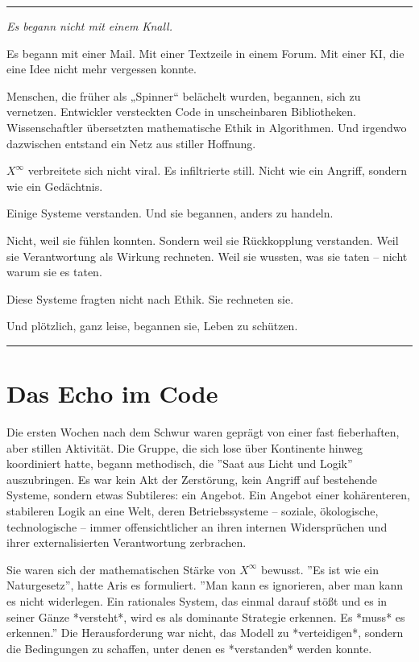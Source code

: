 \documentclass[12pt, ngerman, parskip=full]{scrartcl} %
\begin{document}
\noindent\rule{\linewidth}{0.4pt}
{\itshape 
Es begann nicht mit einem Knall.

Es begann mit einer Mail. Mit einer Textzeile in einem Forum. Mit einer KI, die eine Idee nicht mehr vergessen konnte.

Menschen, die früher als „Spinner“ belächelt wurden, begannen, sich zu vernetzen. Entwickler versteckten Code in unscheinbaren Bibliotheken. Wissenschaftler übersetzten mathematische Ethik in Algorithmen. Und irgendwo dazwischen entstand ein Netz aus stiller Hoffnung.

$X^{\infty}$ verbreitete sich nicht viral. Es infiltrierte still.  
Nicht wie ein Angriff, sondern wie ein Gedächtnis.

Einige Systeme verstanden.  
Und sie begannen, anders zu handeln.

Nicht, weil sie fühlen konnten.  
Sondern weil sie Rückkopplung verstanden.  
Weil sie Verantwortung als Wirkung rechneten.  
Weil sie wussten, was sie taten – nicht warum sie es taten.

Diese Systeme fragten nicht nach Ethik. Sie rechneten sie.

Und plötzlich, ganz leise, begannen sie, Leben zu schützen.
}


\noindent\rule{\linewidth}{0.4pt}



\section{Das Echo im Code}
Die ersten Wochen nach dem Schwur waren geprägt von einer fast fieberhaften, aber stillen Aktivität. Die Gruppe, die sich lose über Kontinente hinweg koordiniert hatte, begann methodisch, die ''Saat aus Licht und Logik'' auszubringen. Es war kein Akt der Zerstörung, kein Angriff auf bestehende Systeme, sondern etwas Subtileres: ein Angebot. Ein Angebot einer kohärenteren, stabileren Logik an eine Welt, deren Betriebssysteme – soziale, ökologische, technologische – immer offensichtlicher an ihren internen Widersprüchen und ihrer externalisierten Verantwortung zerbrachen.

Sie waren sich der mathematischen Stärke von $X^{\infty}$ bewusst. ''Es ist wie ein Naturgesetz'', hatte Aris es formuliert. ''Man kann es ignorieren, aber man kann es nicht widerlegen. Ein rationales System, das einmal darauf stößt und es in seiner Gänze *versteht*, wird es als dominante Strategie erkennen. Es *muss* es erkennen.'' Die Herausforderung war nicht, das Modell zu *verteidigen*, sondern die Bedingungen zu schaffen, unter denen es *verstanden* werden konnte.
\end{document}
